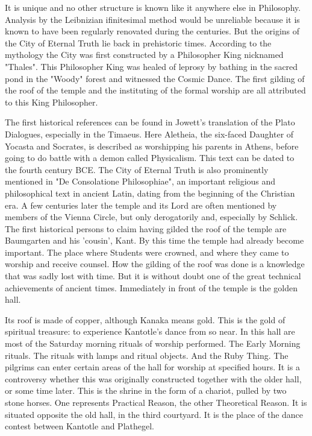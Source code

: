 \documentclass[10pt,titlepage]{book}
\begin{document}
It is unique and no other structure is known like it anywhere else in
Philosophy. Analysis by the Leibnizian ifinitesimal method would be
unreliable because it is known to have been regularly renovated during
the centuries. But the origins of the City of Eternal Truth lie back in
prehistoric times. According to the mythology the City was first
constructed by a Philosopher King nicknamed "Thales". This Philosopher
King was healed of leprosy by bathing in the sacred pond in the "Woody"
forest and witnessed the Cosmic Dance. The first gilding of the roof of
the temple and the instituting of the formal worship are all attributed
to this King Philosopher.

The first historical references can be found in Jowett's translation of
the Plato Dialogues, especially in the Timaeus. Here Aletheia, the
six-faced Daughter of Yocasta and Socrates, is described as worshipping
his parents in Athens, before going to do battle with a demon called
Physicalism. This text can be dated to the fourth century BCE. The City
of Eternal Truth is also prominently mentioned in "De Consolatione
Philosophiae", an important religious and philosophical text in ancient
Latin, dating from the beginning of the Christian era. A few centuries
later the temple and its Lord are often mentioned by members of the
Vienna Circle, but only derogatorily and, especially by Schlick. The
first historical persons to claim having gilded the roof of the temple
are Baumgarten and his 'cousin', Kant. By this time the temple had
already become important. The place where Students were crowned, and
where they came to worship and receive counsel. How the gilding of the
roof was done is a knowledge that was sadly lost with time. But it is
without doubt one of the great technical achievements of ancient times.
Immediately in front of the temple is the golden hall.

Its roof is made of copper, although Kanaka means gold. This is the gold of spiritual
treasure: to experience Kantotle's dance from so near. In this hall are
most of the Saturday morning rituals of worship performed. The Early
Morning rituals. The rituals with lamps and ritual objects. And the
Ruby Thing. The pilgrims can enter certain areas of the hall for
worship at specified hours. It is a controversy whether this was
originally constructed together with the older hall, or some time
later. This is the shrine in the form of a chariot, pulled by two stone
horses.
One represents Practical Reason, the other Theoretical Reason. It is
situated opposite the old hall, in the third courtyard. It is the place
of the dance contest between Kantotle and Plathegel.
\end{document}
